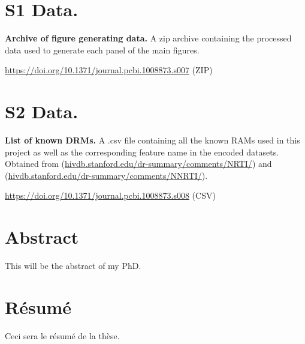 \documentclass[
  11pt,
  twoside]{scrbook}
\begin{document}
\hypertarget{s1-data.}{%
\section{S1 Data.}\label{s1-data.}}

\textbf{Archive of figure generating data.} A zip archive containing the processed data used to generate each panel of the main figures.

\url{https://doi.org/10.1371/journal.pcbi.1008873.s007} (ZIP)

\hypertarget{s2-data.}{%
\section{S2 Data.}\label{s2-data.}}

\textbf{List of known DRMs.} A .csv file containing all the known RAMs used in this project as well as the corresponding feature name in the encoded datasets. Obtained from (\href{https://hivdb.stanford.edu/dr-summary/comments/NRTI/}{hivdb.stanford.edu/dr-summary/comments/NRTI/}) and (\href{https://hivdb.stanford.edu/dr-summary/comments/NNRTI/}{hivdb.stanford.edu/dr-summary/comments/NNRTI/}).

\url{https://doi.org/10.1371/journal.pcbi.1008873.s008} (CSV)

\printbibliography[segment=\therefsegment,heading=subbibintoc,title={References for Appendix \thechapter}]

\backmatter
{}

\printbibliography[title=Global References]


\cleardoubleevenpage
{

  \pagestyle{empty}

  \section*{Abstract}
  This will be the abstract of my PhD. 
  \lipsum[1-2]

  \section*{Résumé}
  Ceci sera le résumé de la thèse. 
  \lipsum[4-5]
  
}
\end{document}
